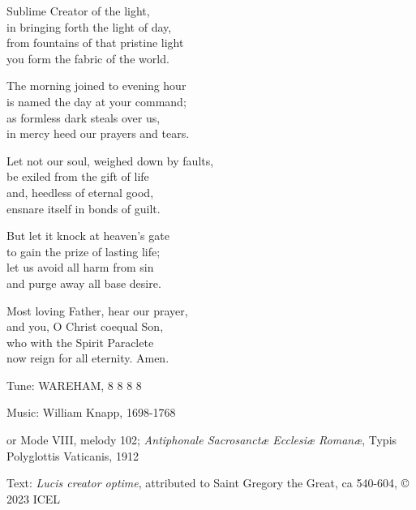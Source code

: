 \hymn

\begin{hymnverse}
Sublime Creator of the light,\\
in bringing forth the light of day,\\
from fountains of that pristine light\\
you form the fabric of the world.

The morning joined to evening hour\\
is named the day at your command;\\
as formless dark steals over us,\\
in mercy heed our prayers and tears.

Let not our soul, weighed down by faults,\\
be exiled from the gift of life\\
and, heedless of eternal good,\\
ensnare itself in bonds of guilt.

But let it knock at heaven’s gate\\
to gain the prize of lasting life;\\
let us avoid all harm from sin\\
and purge away all base desire.

Most loving Father, hear our prayer,\\
and you, O Christ coequal Son,\\
who with the Spirit Paraclete\\
now reign for all eternity. Amen.
\end{hymnverse}

\begin{hymnsource}
Tune: WAREHAM, 8 8 8 8

Music: William Knapp, 1698-1768

or Mode VIII, melody 102; \emph{Antiphonale Sacrosanctæ Ecclesiæ Romanæ}, Typis Polyglottis Vaticanis, 1912

Text: \emph{Lucis creator optime}, attributed to Saint Gregory the Great, ca 540-604, © 2023 ICEL
\end{hymnsource}